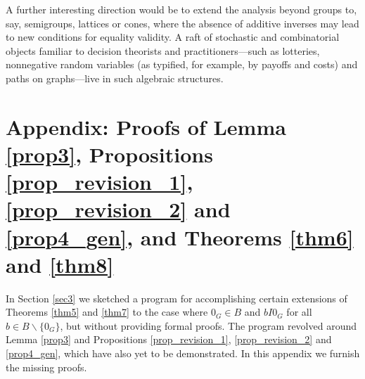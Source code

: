 \documentclass[pdflatex,sn-apa,11pt]{sn-jnl}%
\begin{document}
A further interesting direction would be to extend the analysis beyond groups to, say, semigroups, lattices or cones, where the absence of additive inverses may lead to new conditions for equality validity. A raft of stochastic and combinatorial objects familiar to decision theorists and practitioners---such as lotteries, nonnegative random variables (as typified, for example, by payoffs and costs) and paths on graphs---live in such algebraic structures.

\section{Appendix: Proofs of Lemma \ref{prop3}, Propositions \ref{prop_revision_1}, \ref{prop_revision_2} and \ref{prop4_gen}, and Theorems \ref{thm6} and \ref{thm8}}
\label{sec5}
In Section \ref{sec3} we sketched a program for accomplishing certain extensions of Theorems \ref{thm5} and \ref{thm7} to the case where $0_G \in B$ and $bI0_{G}$ for all $b \in B \backslash \{0_G\}$, but without providing formal proofs. The program revolved around Lemma \ref{prop3} and Propositions \ref{prop_revision_1}, \ref{prop_revision_2} and \ref{prop4_gen}, which have also yet to be demonstrated. In this appendix we furnish the missing proofs.
\end{document}
